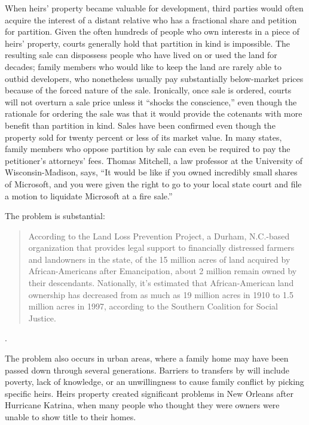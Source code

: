 When heirs' property became valuable for development, third parties would often
acquire the interest of a distant relative who has a fractional share and
petition for partition. Given the often hundreds of people who own interests
in a piece of heirs' property, courts generally hold that partition in kind is
impossible. The resulting sale can dispossess people who have lived on or used
the land for decades; family members who would like to keep the land are rarely
able to outbid developers, who nonetheless usually pay substantially
below-market prices because of the forced nature of the sale. Ironically, once
sale is ordered, courts will not overturn a sale price unless it ``shocks the
conscience,'' even though the rationale for ordering the sale was that it would
provide the cotenants with more benefit than partition in kind. Sales have
been confirmed even though the property sold for twenty percent or less of its
market value. In many states, family members who oppose partition by sale can
even be required to pay the petitioner's attorneys' fees. Thomas Mitchell, a
law professor at the University of Wisconsin-Madison, says, ``It would be like
if you owned incredibly small shares of Microsoft, and you were given the right
to go to your local state court and file a motion to liquidate Microsoft at a
fire sale.''


The problem is substantial:
\begin{quote}
According to the Land Loss Prevention Project, a Durham, N.C.-based organization
that provides legal support to financially distressed farmers and landowners in
the state, of the 15 million acres of land acquired by African-Americans after
Emancipation, about 2 million remain owned by their descendants. Nationally,
it's estimated that African-American land ownership has decreased from as much
as 19 million acres in 1910 to 1.5 million acres in 1997, according to the
Southern Coalition for Social Justice.
\end{quote}
.

The problem also occurs in urban areas, where a family home may have been passed
down through several generations. Barriers to transfers by will include
poverty, lack of knowledge, or an unwillingness to cause family conflict by
picking specific heirs. Heirs property created significant problems in New
Orleans after Hurricane Katrina, when many people who thought they were owners
were unable to show title to their homes.

